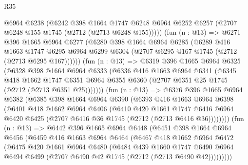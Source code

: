 \begin{lexlean}{R35}
\begin{coremodule}
          @6964
          @6238
          (@6242
            @398
            @1664
            @1747
            @6248
            @6964
            @6252
            @6257
            (@2707 @6248 @155 @1745 (@2712 (@2713 @6248 @155)))))
        (fun (n : @13) =>
        @6271
          @396
          @1665
          @6964
          @6277
          (@6280
            @398
            @1664
            @6964
            @6285
            (@6289
              @416
              @1663
              @1747
              @6295
              @6964
              @6299
              @6304
              (@2707 @6295 @167 @1745 (@2712 (@2713 @6295 @167))))))
        (fun (n : @13) =>
        @6319
          @396
          @1665
          @6964
          @6325
          (@6328
            @398
            @1664
            @6964
            @6333
            (@6336
              @416
              @1663
              @6964
              @6341
              (@6345
                @418
                @1662
                @1747
                @6351
                @6964
                @6355
                @6360
                (@2707 @6351 @25 @1745 (@2712 (@2713 @6351 @25)))))))
        (fun (n : @13) =>
        @6376
          @396
          @1665
          @6964
          @6382
          (@6385
            @398
            @1664
            @6964
            @6390
            (@6393
              @416
              @1663
              @6964
              @6398
              (@6401
                @418
                @1662
                @6964
                @6406
                (@6410
                  @420
                  @1661
                  @1747
                  @6416
                  @6964
                  @6420
                  @6425
                  (@2707 @6416 @36 @1745 (@2712 (@2713 @6416 @36))))))))
        (fun (n : @13) =>
        @6442
          @396
          @1665
          @6964
          @6448
          (@6451
            @398
            @1664
            @6964
            @6456
            (@6459
              @416
              @1663
              @6964
              @6464
              (@6467
                @418
                @1662
                @6964
                @6472
                (@6475
                  @420
                  @1661
                  @6964
                  @6480
                  (@6484
                    @439
                    @1660
                    @1747
                    @6490
                    @6964
                    @6494
                    @6499
                    (@2707 @6490 @42 @1745 (@2712 (@2713 @6490 @42)))))))))

\end{coremodule}
\end{lexlean}
